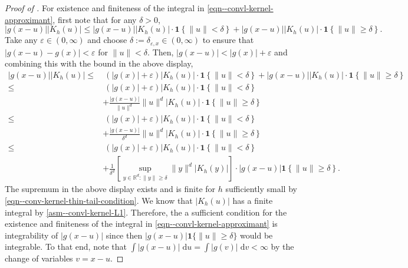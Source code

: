 \begin{proof}[Proof of ]
For existence and finiteness of the integral in
\eqref{eqn--convl-kernel-approximant}, first note that for any \(\delta > 0\),
\begin{equation*}
  |g (x - u)| \left| K_{h} (u) \right| \leq |g (x - u)| \left| K_{h} (u) \right|
  \cdot \mathbf{1} \left\{ \|u\| < \delta \right\} + |g (x - u)| \left| K_{h}
  (u) \right| \cdot \mathbf{1} \left\{ \|u\| \geq \delta \right\}.
\end{equation*}
Take any \(\varepsilon \in (0, \infty)\) and choose \(\delta :=
\delta_{\varepsilon, x} \in (0, \infty)\) to ensure that \(|g (x - u) - g (x)| <
\varepsilon\) for \(\|u\| < \delta\).
Then, \(|g (x - u)| < |g (x)| + \varepsilon\) and combining this with the bound
in the above display,
\begin{align*}
  |g (x - u)| \left| K_{h} (u) \right| \leq
  & \ (|g (x)| + \varepsilon) \left| K_{h} (u) \right|
  \cdot \mathbf{1} \left\{ \|u\| < \delta \right\} + |g (x - u)| \left| K_{h}
  (u) \right| \cdot \mathbf{1} \left\{ \|u\| \geq \delta \right\} \\
  \leq
  & \ (|g (x)| + \varepsilon) \left| K_{h} (u) \right| \cdot \mathbf{1} \left\{
  \|u\| < \delta \right\} \\
  & + \frac{|g (x - u)|}{\|u\|^{d}} \|u\|^{d} \left| K_{h} (u) \right| \cdot
  \mathbf{1} \left\{ \|u\| \geq \delta \right\} \\
  \leq
  & \ (|g (x)| + \varepsilon) \left| K_{h} (u) \right| \cdot \mathbf{1} \left\{
  \|u\| < \delta \right\} \\
  & + \frac{|g (x - u)|}{\delta^{d}} \|u\|^{d} \left| K_{h} (u) \right| \cdot
  \mathbf{1} \left\{ \|u\| \geq \delta \right\} \\
  \leq
  & \ (|g (x)| + \varepsilon) \left| K_{h} (u) \right| \cdot \mathbf{1} \left\{
  \|u\| < \delta \right\} \\
  & + \frac{1}{\delta^{d}} \left[ \sup_{y \in \mathbb{R}^{d} : \|y\| \geq
  \delta} \|y\|^{d} \left| K_{h} (y) \right| \right] \cdot |g (x - u)|
  \mathbf{1} \left\{ \|u\| \geq \delta \right\}.
\end{align*}
The supremum in the above display exists and is finite for \(h\) sufficiently
small by \eqref{eqn--conv-kernel-thin-tail-condition}.
We know that \(\left| K_{h} (u) \right|\) has a finite integral by
 \ref{asm--convl-kernel-L1}.
Therefore, the a sufficient condition for the existence and finiteness of the
integral in \eqref{eqn--convl-kernel-approximant} is integrability of \(|g (x -
u)|\) since then \(|g (x - u)| \mathbf{1} \{\|u\| \geq \delta\}\) would be
integrable.
To that end, note that \(\int |g (x - u)| \; \mathrm{d} u = \int |g (v)| \;
\mathrm{d} v < \infty\) by the change of variables \(v = x - u\).


\end{proof}
